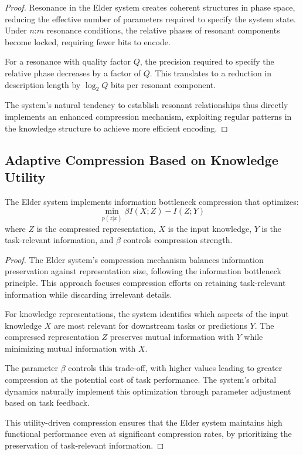 \begin{proof}
Resonance in the Elder system creates coherent structures in phase space, reducing the effective number of parameters required to specify the system state. Under $n$:$m$ resonance conditions, the relative phases of resonant components become locked, requiring fewer bits to encode.

For a resonance with quality factor $Q$, the precision required to specify the relative phase decreases by a factor of $Q$. This translates to a reduction in description length by $\log_2 Q$ bits per resonant component.

The system's natural tendency to establish resonant relationships thus directly implements an enhanced compression mechanism, exploiting regular patterns in the knowledge structure to achieve more efficient encoding.
\end{proof}

\subsection{Adaptive Compression Based on Knowledge Utility}

\begin{theorem}
The Elder system implements information bottleneck compression that optimizes:
\begin{equation}
\min_{p(z|x)} \beta I(X; Z) - I(Z; Y)
\end{equation}
where $Z$ is the compressed representation, $X$ is the input knowledge, $Y$ is the task-relevant information, and $\beta$ controls compression strength.
\end{theorem}

\begin{proof}
The Elder system's compression mechanism balances information preservation against representation size, following the information bottleneck principle. This approach focuses compression efforts on retaining task-relevant information while discarding irrelevant details.

For knowledge representations, the system identifies which aspects of the input knowledge $X$ are most relevant for downstream tasks or predictions $Y$. The compressed representation $Z$ preserves mutual information with $Y$ while minimizing mutual information with $X$.

The parameter $\beta$ controls this trade-off, with higher values leading to greater compression at the potential cost of task performance. The system's orbital dynamics naturally implement this optimization through parameter adjustment based on task feedback.

This utility-driven compression ensures that the Elder system maintains high functional performance even at significant compression rates, by prioritizing the preservation of task-relevant information.
\end{proof}

